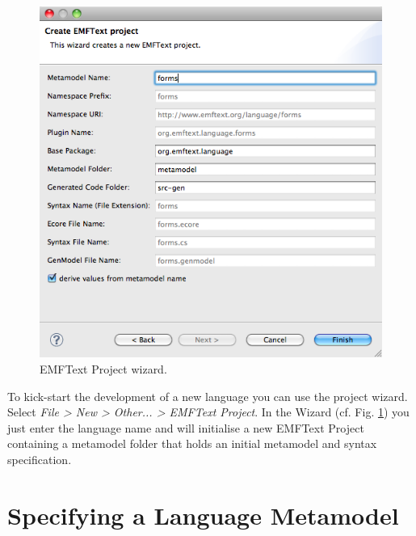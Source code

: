 	\begin{figure}[ht]
	\centering
		\includegraphics[scale=0.5]{figures/wizard}
	\caption{EMFText Project wizard.}
	\label{fig:wizard}
	\end{figure}

	

	To kick-start the development of a new language you can use the \EMFText project
	wizard. Select \emph{File > New > Other... > EMFText Project}. In the Wizard
	(cf. Fig. \ref{fig:wizard}) you just enter the language name and \EMFText
	will initialise a new EMFText Project containing a metamodel folder that
	holds an initial metamodel and syntax specification.

\section{Specifying a Language Metamodel}

